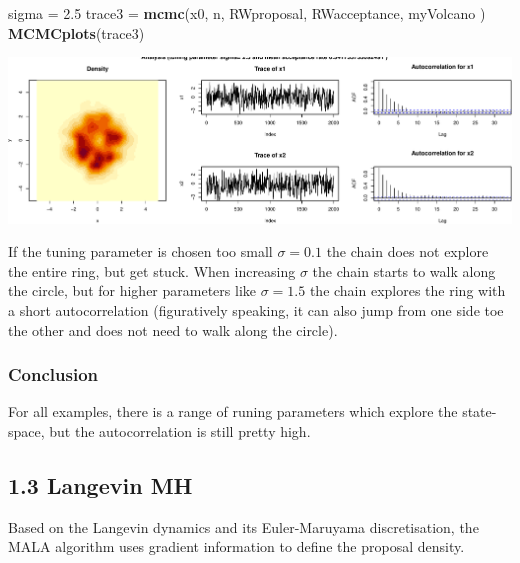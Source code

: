 \documentclass[
]{article}
\newenvironment{Shaded}{\begin{snugshade}}{\end{snugshade}}
\newcommand{\FloatTok}[1]{\textcolor[rgb]{0.00,0.00,0.81}{#1}}
\newcommand{\KeywordTok}[1]{\textcolor[rgb]{0.13,0.29,0.53}{\textbf{#1}}}
\newcommand{\NormalTok}[1]{#1}
\newcommand{\StringTok}[1]{\textcolor[rgb]{0.31,0.60,0.02}{#1}}
\begin{document}
\begin{Shaded}
\begin{Highlighting}[]
\NormalTok{sigma =}\StringTok{ }\FloatTok{2.5}
\NormalTok{trace3 =}\StringTok{ }\KeywordTok{mcmc}\NormalTok{(x0, n, RWproposal, RWacceptance, myVolcano )}
\KeywordTok{MCMCplots}\NormalTok{(trace3)}
\end{Highlighting}
\end{Shaded}

\includegraphics{Project1_files/figure-latex/RandomWalk3-4.pdf}

If the tuning parameter is chosen too small \(\sigma=0.1\) the chain
does not explore the entire ring, but get stuck. When increasing
\(\sigma\) the chain starts to walk along the circle, but for higher
parameters like \(\sigma=1.5\) the chain explores the ring with a short
autocorrelation (figuratively speaking, it can also jump from one side
toe the other and does not need to walk along the circle).

\hypertarget{conclusion}{%
\subsubsection{Conclusion}\label{conclusion}}

For all examples, there is a range of runing parameters which explore
the state-space, but the autocorrelation is still pretty high.

\hypertarget{langevin-mh}{%
\subsection{1.3 Langevin MH}\label{langevin-mh}}

Based on the Langevin dynamics and its Euler-Maruyama discretisation,
the MALA algorithm uses gradient information to define the proposal
density.
\end{document}
